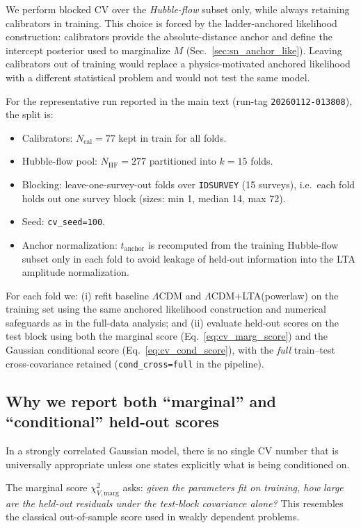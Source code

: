 \documentclass[10pt]{article}
\newcommand{\tA}{t_{\mathrm{anchor}}}
\begin{document}
We perform blocked CV over the \emph{Hubble-flow} subset only, while always retaining calibrators in
training. This choice is forced by the ladder-anchored likelihood construction:
calibrators provide the absolute-distance anchor and define the intercept posterior used to
marginalize $M$ (Sec.~\ref{sec:sn_anchor_like}). Leaving calibrators out of training would replace
a physics-motivated anchored likelihood with a different statistical problem and would not test the
same model.

For the representative run reported in the main text (run-tag \texttt{20260112-013808}), the split
is:
\begin{itemize}[leftmargin=1.2em]
\item Calibrators: $N_{\mathrm{cal}}=77$ kept in train for all folds.
\item Hubble-flow pool: $N_{\mathrm{HF}}=277$ partitioned into $k=15$ folds.
\item Blocking: leave-one-survey-out folds over \texttt{IDSURVEY} (15 surveys), i.e.\ each fold holds
out one survey block (sizes: min 1, median 14, max 72).
\item Seed: \texttt{cv\_seed=100}.
\item Anchor normalization: $\tA$ is recomputed from the training Hubble-flow subset only in each
fold to avoid leakage of held-out information into the LTA amplitude normalization.
\end{itemize}

For each fold we:
(i) refit baseline $\Lambda$CDM and $\Lambda$CDM+LTA(powerlaw) on the training set using the same
anchored likelihood construction and numerical safeguards as in the full-data analysis; and
(ii) evaluate held-out scores on the test block using both the marginal score
(Eq.~\eqref{eq:cv_marg_score}) and the Gaussian conditional score (Eq.~\eqref{eq:cv_cond_score}),
with the \emph{full} train--test cross-covariance retained (\texttt{cond\_cross=full} in the
pipeline).

\subsection{Why we report both ``marginal'' and ``conditional'' held-out scores}
\label{app:cv:both}

In a strongly correlated Gaussian model, there is no single CV number that is universally
appropriate unless one states explicitly what is being conditioned on.

The marginal score $\chi^2_{V,\mathrm{marg}}$ asks: \emph{given the parameters fit on training, how
large are the held-out residuals under the test-block covariance alone?} This resembles the
classical out-of-sample score used in weakly dependent problems.
\end{document}
